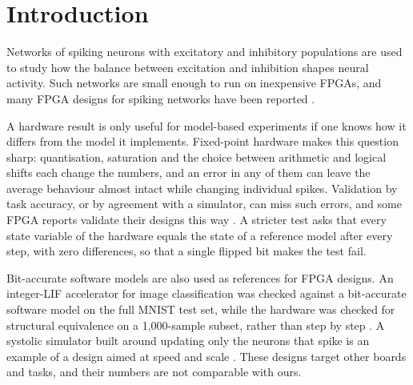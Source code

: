 \documentclass[11pt]{article}
\begin{document}
\section{Introduction}
Networks of spiking neurons with excitatory and inhibitory populations are used to study how the balance between excitation and inhibition shapes neural activity.
Such networks are small enough to run on inexpensive FPGAs, and many FPGA designs for spiking networks have been reported \citep{szczerek2025}.

A hardware result is only useful for model-based experiments if one knows how it differs from the model it implements.
Fixed-point hardware makes this question sharp: quantisation, saturation and the choice between arithmetic and logical shifts each change the numbers, and an error in any of them can leave the average behaviour almost intact while changing individual spikes.
Validation by task accuracy, or by agreement with a simulator, can miss such errors, and some FPGA reports validate their designs this way \citep{fan2025,gautam2025}.
A stricter test asks that every state variable of the hardware equals the state of a reference model after every step, with zero differences, so that a single flipped bit makes the test fail.

Bit-accurate software models are also used as references for FPGA designs.
An integer-LIF accelerator for image classification was checked against a bit-accurate software model on the full MNIST test set, while the hardware was checked for structural equivalence on a 1,000-sample subset, rather than step by step \citep{ansari2026}.
A systolic simulator built around updating only the neurons that spike is an example of a design aimed at speed and scale \citep{cheung2009}.
These designs target other boards and tasks, and their numbers are not comparable with ours.
\end{document}
